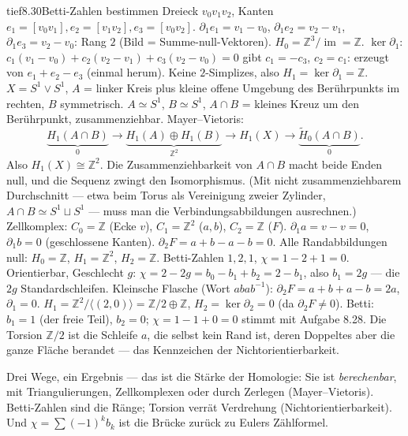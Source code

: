 \begin{loesungkarte}{tief}{8.30}{Betti-Zahlen bestimmen}
Dreieck $v_0v_1v_2$, Kanten $e_1 = [v_0v_1], e_2 = [v_1v_2], e_3 = [v_0v_2]$. $\partial_1 e_1 = v_1 - v_0$, $\partial_1e_2 = v_2 - v_1$, $\partial_1e_3 = v_2 - v_0$: Rang $2$ (Bild = Summe-null-Vektoren). $H_0 = \mathbb Z^{3}/\operatorname{im} = \mathbb Z$. $\ker\partial_1$: $c_1(v_1 - v_0) + c_2(v_2 - v_1) + c_3(v_2 - v_0) = 0$ gibt $c_1 = -c_3$, $c_2 = c_1$: erzeugt von $e_1 + e_2 - e_3$ (einmal herum). Keine $2$-Simplizes, also $H_1 = \ker\partial_1 = \mathbb Z$.
$X = S^{1}\vee S^{1}$, $A$ = linker Kreis plus kleine offene Umgebung des Berührpunkts im rechten, $B$ symmetrisch. $A\simeq S^{1}$, $B\simeq S^{1}$, $A\cap B$ = kleines Kreuz um den Berührpunkt, zusammenziehbar. Mayer--Vietoris:
\[ \underbrace{H_1(A\cap B)}_{0}\to\underbrace{H_1(A)\oplus H_1(B)}_{\mathbb Z^{2}}\to H_1(X)\to\underbrace{\tilde H_0(A\cap B)}_{0}. \]
Also $H_1(X)\cong\mathbb Z^{2}$. Die Zusammenziehbarkeit von $A\cap B$ macht beide Enden null, und die Sequenz zwingt den Isomorphismus. (Mit nicht zusammenziehbarem Durchschnitt --- etwa beim Torus als Vereinigung zweier Zylinder, $A\cap B\simeq S^{1}\sqcup S^{1}$ --- muss man die Verbindungsabbildungen ausrechnen.)
Zellkomplex: $C_0 = \mathbb Z$ (Ecke $v$), $C_1 = \mathbb Z^{2}$ ($a, b$), $C_2 = \mathbb Z$ ($F$). $\partial_1 a = v - v = 0$, $\partial_1 b = 0$ (geschlossene Kanten). $\partial_2 F = a + b - a - b = 0$. Alle Randabbildungen null: $H_0 = \mathbb Z$, $H_1 = \mathbb Z^{2}$, $H_2 = \mathbb Z$. Betti-Zahlen $1, 2, 1$, $\chi = 1 - 2 + 1 = 0$. \checkmark
{}
Orientierbar, Geschlecht $g$: $\chi = 2 - 2g = b_0 - b_1 + b_2 = 2 - b_1$, also $b_1 = 2g$ --- die $2g$ Standardschleifen. Kleinsche Flasche (Wort $abab^{-1}$): $\partial_2F = a + b + a - b = 2a$, $\partial_1 = 0$. $H_1 = \mathbb Z^{2}/\langle(2, 0)\rangle = \mathbb Z/2\oplus\mathbb Z$, $H_2 = \ker\partial_2 = 0$ (da $\partial_2F\neq0$). Betti: $b_1 = 1$ (der freie Teil), $b_2 = 0$; $\chi = 1 - 1 + 0 = 0$ stimmt mit Aufgabe 8.28. Die Torsion $\mathbb Z/2$ ist die Schleife $a$, die selbst kein Rand ist, deren Doppeltes aber die ganze Fläche berandet --- das Kennzeichen der Nichtorientierbarkeit.
\begin{mitnehmen}\kastentext
Drei Wege, ein Ergebnis --- das ist die Stärke der Homologie: Sie ist \emph{berechenbar}, mit Triangulierungen, Zellkomplexen oder durch Zerlegen (Mayer--Vietoris). Betti-Zahlen sind die Ränge; Torsion verrät Verdrehung (Nichtorientierbarkeit). Und $\chi = \sum(-1)^{k}b_k$ ist die Brücke zurück zu Eulers Zählformel.
\end{mitnehmen}
\end{loesungkarte}


